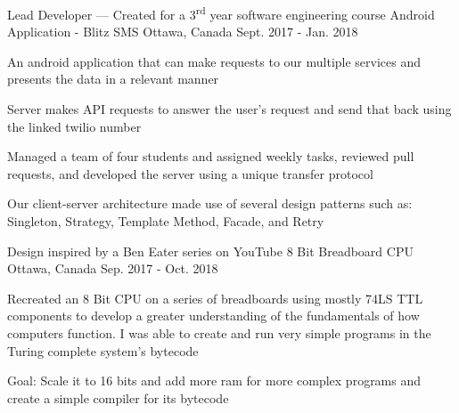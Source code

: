 
\begin{cventries}
	\cventry
		{Lead Developer --- Created for a 3\textsuperscript{rd} year software engineering course}
		{Android Application - Blitz SMS}
		{Ottawa, Canada}
		{Sept. 2017 - Jan. 2018}
		{\begin{cvitems}
			\item An android application that can make requests to our multiple services and presents the data in a relevant manner
			\item Server makes API requests to answer the user's request and send that back using the linked twilio number
			\item Managed a team of four students and assigned weekly tasks, reviewed pull requests, and developed the server using a unique transfer protocol
			\item Our client-server architecture made use of several design patterns such as: Singleton, Strategy, Template Method, Facade, and Retry
		\end{cvitems}}

	\cventry
		{Design inspired by a Ben Eater series on YouTube}
		{8 Bit Breadboard CPU}
		{Ottawa, Canada}
		{Sep. 2017 - Oct. 2018}
		{\begin{cvitems}
			\item Recreated an 8 Bit CPU on a series of breadboards using mostly 74LS TTL components to develop a greater understanding of the fundamentals of how computers function. I was able to create and run very simple programs in the Turing complete system's bytecode
			\item Goal: Scale it to 16 bits and add more ram for more complex programs and create a simple compiler for its bytecode
		\end{cvitems}}
\end{cventries}